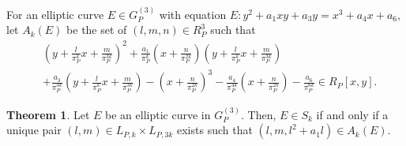 \documentclass[12pt,letterpaper]{amsart}
\theoremstyle{definition}
\newtheorem{theorem}{Theorem}[section]
\begin{document}
For an elliptic curve $E\in G_P^{(3)}$ with equation $E:y^2+a_1xy+a_3y=x^3+a_4x+a_6$, let $A_k(E)$ be the set of $(l,m,n)\in R_P^3$ such that
\begin{align*}
& \left(y+\frac{l}{\pi_P^k}x+\frac{m}{\pi_P^{3k}}\right)^2+\frac{a_1}{\pi_P^k}\left(x+\frac{n}{\pi_P^{2k}}\right)\left(y+\frac{l}{\pi_P^k}x+\frac{m}{\pi_P^{3k}}\right) \\
& + \frac{a_3}{\pi_P^{3k}}\left(y+\frac{l}{\pi_P^k}x+\frac{m}{\pi_P^{3k}}\right) 
- \left(x+\frac{n}{\pi_P^{2k}}\right)^3-\frac{a_4}{\pi_P^{4k}}\left(x+\frac{n}{\pi_P^{2k}}\right)-\frac{a_6}{\pi_P^{6k}} \in R_P[x,y].
\end{align*}

\begin{theorem}
\label{prop:unique2}
Let $E$ be an elliptic curve in $G_P^{(3)}$. Then, $E\in S_k$ if and only if a unique pair $(l,m)\in L_{P,k}\times L_{P,3k}$ exists such that $(l,m,l^2+a_1l)\in A_k(E)$.
\end{theorem}
\end{document}
